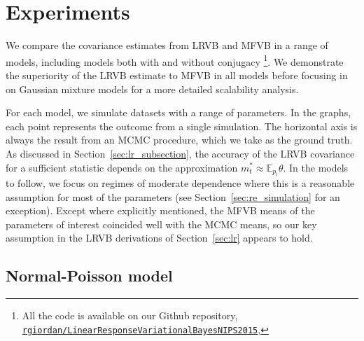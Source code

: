 \documentclass{article}\usepackage[]{graphicx}\usepackage[]{color}
\newcommand{\mysec}[1]{Section~\ref{sec:#1}}
\newcommand{\mpopt}{m^*} %
\newcommand{\mbe}{\mathbb{E}}
\begin{document}
\section{Experiments} \label{sec:experiments}

We compare the covariance estimates from LRVB and MFVB in a range of models,
including models both with and without conjugacy
\footnote{All the code is available on our Github repository,
\href{https://github.com/rgiordan/LinearResponseVariationalBayesNIPS2015}{\texttt{rgiordan/LinearResponseVariationalBayesNIPS2015}},
}.
We demonstrate the superiority
of the LRVB estimate to MFVB in all models before focusing in on Gaussian
mixture models for a more detailed scalability analysis.

For each model, we simulate datasets with a range of parameters.  In the graphs,
each point represents the outcome from a single simulation.  The horizontal axis
is always the result from an MCMC procedure, which we take as the ground truth.
As discussed in \mysec{lr_subsection}, the accuracy of the LRVB covariance for a
sufficient statistic depends on the approximation $\mpopt_t \approx \mbe_{p_t}
\theta$. In the models to follow, we focus on regimes of moderate dependence
where this is a reasonable assumption for most of the parameters (see
\mysec{re_simulation} for an exception). Except where explicitly mentioned, the
MFVB means of the parameters of interest coincided well with the MCMC means, so
our key assumption in the LRVB derivations of \mysec{lr} appears to hold.

\subsection{Normal-Poisson model} \label{sec:normal_poisson_model}
\end{document}
